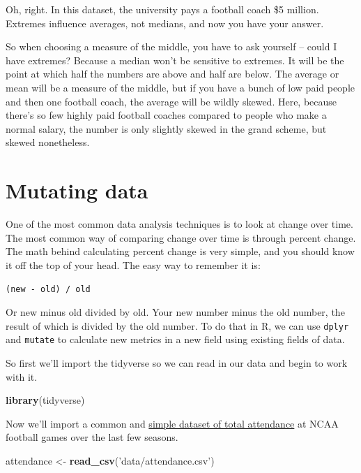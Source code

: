 \documentclass[]{book}
\newenvironment{Shaded}{\begin{snugshade}}{\end{snugshade}}
\newcommand{\KeywordTok}[1]{\textcolor[rgb]{0.13,0.29,0.53}{\textbf{#1}}}
\newcommand{\StringTok}[1]{\textcolor[rgb]{0.31,0.60,0.02}{#1}}
\newcommand{\NormalTok}[1]{#1}
\begin{document}
Oh, right. In this dataset, the university pays a football coach \$5
million. Extremes influence averages, not medians, and now you have your
answer.

So when choosing a measure of the middle, you have to ask yourself --
could I have extremes? Because a median won't be sensitive to extremes.
It will be the point at which half the numbers are above and half are
below. The average or mean will be a measure of the middle, but if you
have a bunch of low paid people and then one football coach, the average
will be wildly skewed. Here, because there's so few highly paid football
coaches compared to people who make a normal salary, the number is only
slightly skewed in the grand scheme, but skewed nonetheless.

\chapter{Mutating data}\label{mutating-data}

One of the most common data analysis techniques is to look at change
over time. The most common way of comparing change over time is through
percent change. The math behind calculating percent change is very
simple, and you should know it off the top of your head. The easy way to
remember it is:

\texttt{(new\ -\ old)\ /\ old}

Or new minus old divided by old. Your new number minus the old number,
the result of which is divided by the old number. To do that in R, we
can use \texttt{dplyr} and \texttt{mutate} to calculate new metrics in a
new field using existing fields of data.

So first we'll import the tidyverse so we can read in our data and begin
to work with it.

\begin{Shaded}
\begin{Highlighting}[]
\KeywordTok{library}\NormalTok{(tidyverse)}
\end{Highlighting}
\end{Shaded}

Now we'll import a common and
\href{https://unl.box.com/s/hvxmnxhr41x4ikgt3vk38aczcbrf97pn}{simple
dataset of total attendance} at NCAA football games over the last few
seasons.

\begin{Shaded}
\begin{Highlighting}[]
\NormalTok{attendance <-}\StringTok{ }\KeywordTok{read_csv}\NormalTok{(}\StringTok{'data/attendance.csv'}\NormalTok{)}
\end{Highlighting}
\end{Shaded}
\end{document}

